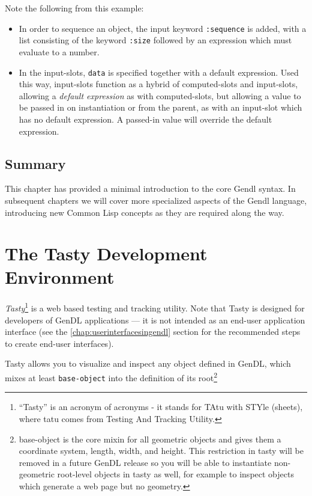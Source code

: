 \documentclass [11pt]{book}
\begin{document}
Note the following from this example:

\begin{itemize}

\item In order to sequence an object, the input keyword \texttt{:sequence} is added, with a list consisting of the keyword \texttt{:size} followed by an expression which must evaluate to a number.

\item In the input-slots, \texttt{data} is specified together with a default expression. Used this way, 
input-slots function as a hybrid of computed-slots and input-slots, allowing a \emph{default expression} as with computed-slots, but allowing a value to be passed in on 
instantiation or from the parent, as with an input-slot which has no default expression. 
A passed-in value will override the default expression.

\end{itemize}



\section{Summary}

\label{sec:summary}

This chapter has provided a minimal introduction to the core
Gendl syntax. In subsequent chapters we will cover more specialized
aspects of the Gendl language, introducing new Common Lisp concepts as
they are required along the way.

\chapter{The Tasty Development Environment}

\label{chap:thetastydevelopmentenvironment}



\emph{Tasty}\footnote{``Tasty'' is an acronym of acronyms - it stands
for TAtu with STYle (sheets), where tatu comes from Testing And
Tracking Utility.} is a web based testing and tracking utility. Note that Tasty is
designed for developers of GenDL applications --- it is not intended
as an end-user application interface (see the 
\ref{chap:userinterfacesingendl} section for the recommended steps to create end-user interfaces).



Tasty allows you to visualize and inspect any object defined in GenDL,
which mixes at least \texttt{base-object} into the definition of its root\footnote{base-object is the core mixin for all geometric objects
and gives them a coordinate system, length, width, and height. This
restriction in tasty will be removed in a future GenDL release so you
will be able to instantiate non-geometric root-level objects in tasty
as well, for example to inspect objects which generate a web page but
no geometry.}
\end{document}
